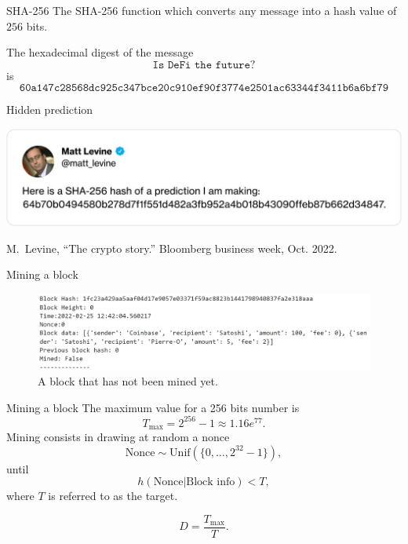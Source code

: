 \documentclass{beamer}
\begin{document}
\begin{frame}{SHA-256}
The SHA-256 function which converts any message into a hash value of $256$ bits.
\begin{tcolorbox}[enhanced,drop shadow, title=Example]
The hexadecimal digest of the message
$$
\texttt{Is DeFi the future?}
$$
is 
\footnotesize
$$
\texttt{60a147c28568dc925c347bce20c910ef90f3774e2501ac63344f3411b6a6bf79}
$$
\end{tcolorbox}
\end{frame}
\begin{frame}{Hidden prediction}
\begin{center}
 \includegraphics[width= \textwidth]{../../Figures/levine_twitter}
\end{center}
\footnotesize{
\begin{thebibliography}{1}
M.~Levine, ``The crypto story.'' Bloomberg business week, Oct. 2022.\\
\end{thebibliography}  
}




\end{frame}
\begin{frame}{Mining a block}
\begin{figure}[!ht]
    \includegraphics[width = \textwidth]{../../Figures/block_not_mined.png}
    \captionsetup{width=0.8\textwidth}
    \centering
    \caption{A block that has not been mined yet.}
    \label{fig:block_not_mined}
\end{figure}
\end{frame}
\begin{frame}{Mining a block}
The maximum value for a 256 bits number is
$$
T_\text{max} = 2^{256}-1 \approx 1.16e^{77}.
$$
Mining consists in drawing at random a nonce 
$$
\text{Nonce} \sim \text{Unif}(\{0,\ldots, 2^{32}-1\}),
$$
until 
$$
h(\text{Nonce}|\text{Block info})<T,
$$
where $T$ is referred to as the target.
\begin{tcolorbox}[enhanced,drop shadow, title=Difficulty of the cryptopuzzle]
$$
D = \frac{T_{\max}}{T}.
$$
\end{tcolorbox}

\end{frame}
\end{document}
